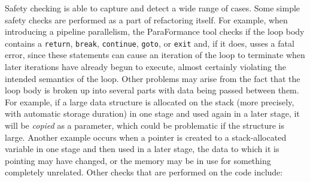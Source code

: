 Safety checking is able to capture and detect a wide range of cases. Some simple safety checks are performed as a part of refactoring itself. For example, when introducing a pipeline parallelism,
the ParaFormance tool checks if the loop body contains a \texttt{return}, \texttt{break}, \texttt{continue}, \texttt{goto}, or \texttt{exit} and, if it does, usses  a fatal error, since these statements can cause an iteration of the loop to terminate when later iterations have already begun to execute, almost certainly violating the intended semantics of the loop. Other problems may arise from the fact that the loop body is broken up into several parts with data being passed between them. For example, if a large data structure is allocated on the stack (more precisely, with automatic storage duration) in one stage and used again in a later stage, it will be \emph{copied} as a parameter, which could be problematic if the structure is large. Another example occurs when a pointer is created to a stack-allocated variable in one stage and then used in a later stage, the data to which it is pointing may have changed, or the memory may be in use for something completely unrelated.
Other checks that are performed on the code include:

